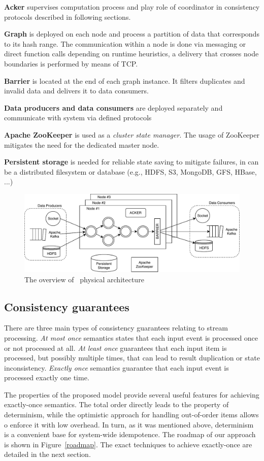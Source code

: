 {\bf Acker} supervises computation process and play role of coordinator in consistency protocols described in following sections.

{\bf Graph} is deployed on each node and process a partition of data that corresponds to its hash range. The communication within a node is done via messaging or direct function calls depending on runtime heuristics, a delivery that crosses node boundaries is performed by means of TCP.

{\bf Barrier} is located at the end of each graph instance. It filters duplicates and invalid data and delivers it to data consumers.

{\bf Data producers and data consumers} are deployed separately and communicate with system via defined protocols

{\bf Apache ZooKeeper} is used as a {\it cluster state manager}. The usage of ZooKeeper mitigates the need for the dedicated master node.

{\bf Persistent storage} is needed for reliable state saving to mitigate failures, in can be a distributed filesystem or database (e.g., HDFS, S3, MongoDB, GFS, HBase, ...)


\begin{figure}[htbp]
  \centering
  \includegraphics[scale=0.78]{pics/arch}
  \caption{The overview of \FlameStream\ physical architecture}
  \label {arch}
\end{figure}

\subsection{Consistency guarantees}
There are three main types of consistency guarantees relating to stream processing. {\it At most once} semantics states that each input event is processed once or not processed at all. {\it At least once} guarantees that each input item is processed, but possibly multiple times, that can lead to result duplication or state inconsistency. {\it Exactly once} semantics guarantee that each input event is processed exactly one time. 

The properties of the proposed model provide several useful features for achieving exactly-once semantics. The total order directly leads to the property of determinism, while the optimistic approach for handling out-of-order items allows o enforce it with low overhead. In turn, as it was mentioned above, determinism is a convenient base for system-wide idempotence. The roadmap of our approach is shown in Figure~\ref{roadmap}. The exact techniques to achieve exactly-once are detailed in the next section. 
